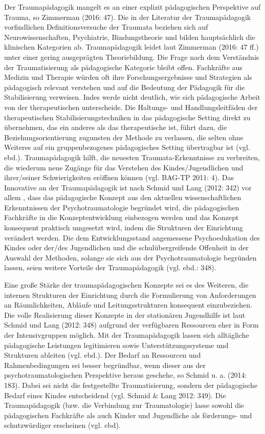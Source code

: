 Der Traumapädagogik mangelt es an einer explizit pädagogischen Perspektive auf Trauma, so Zimmerman (2016: 47). Die in der Literatur der Traumapädagogik vorfindlichen Definitionsversuche der Traumata beziehen sich auf Neurowissenschaften, Psychiatrie, Bindungstheorie und bilden hauptsächlich die klinischen Kategorien ab. Traumap{\"a}dagogik leidet laut Zimmerman (2016: 47 ff.) unter einer gering ausgeprägten Theoriebildung. Die Frage nach dem Verständnis der Traumatisierung als pädagogische Kategorie bleibt offen. Fachkräfte aus Medizin und Therapie würden oft ihre Forschungsergebnisse und Strategien als pädagogisch relevant verstehen und auf die Bedeutung der Pädagogik für die Stabilisierung verweisen. Indes werde nicht deutlich, wie sich pädagogische Arbeit von der therapeutischen unterscheide. Die Haltungs- und Handlungsleitfäden der therapeutischen Stabilisierungstechniken in das pädagogische Setting direkt zu übernehmen, das ein anderes als das therapeutische ist, führt dazu, die Beziehungsorientierung zugunsten der Methode zu verlassen, die selten ohne Weiteres auf ein gruppenbezogenes pädagogisches Setting übertragbar ist (vgl. ebd.). Traumapädagogik hilft, die neuesten Traumata-Erkenntnisse zu verbreiten, die wiederum neue Zugänge für das Verstehen des Kindes/Jugendlichen und ihrer/seiner Schwierigkeiten eröffnen können (vgl. BAG-TP 2011: 4).  
Das Innovative an der Traumap{\"a}dagogik ist nach Schmid und Lang (2012: 342) vor allem , dass das pädagogische Konzept aus den aktuellen wissenschaftlichen Erkenntnissen der Psychotraumatologie begründet wird, die pädagogischen Fachkräfte in die Konzeptentwicklung einbezogen werden und das Konzept konsequent praktisch umgesetzt wird, indem die Strukturen der Einrichtung verändert werden. Die dem Entwicklungsstand angemessene Psychoedukation des Kindes oder der/des Jugendlichen und die schulübergreifende Offenheit in der Auswahl der Methoden, solange sie sich aus der Psychotraumatologie begründen lassen, seien weitere Vorteile der Traumapädagogik (vgl. ebd.: 348).

Eine große Stärke der traumapädagogischen Konzepte sei es des Weiteren, die internen Strukturen der Einrichtung durch die Formulierung von Anforderungen an Räumlichkeiten, Abläufe und Leitungsstrukturen konsequent einzubeziehen. Die volle Realisierung dieser Konzepte in der stationären Jugendhilfe ist laut Schmid und Lang (2012: 348) aufgrund der verfügbaren Ressourcen eher in Form der Intensivgruppen möglich. Mit der Traumapädagogik lassen sich alltägliche pädagogische Leistungen legitimieren sowie Unterstützungssysteme und Strukturen ableiten (vgl. ebd.). Der Bedarf an Ressourcen und Rahmenbedingungen sei besser begründbar, wenn dieser aus der psychotraumatologischen Perspektive heraus geschehe, so Schmid u. a. (2014: 183). Dabei sei nicht die festgestellte Traumatisierung, sondern der p{\"a}dagogische Bedarf eines Kindes entscheidend (vgl. Schmid \& Lang 2012: 349). Die Traumapädagogik (bzw. die Verbindung zur Traumatologie) lasse sowohl die pädagogischen Fachkräfte als auch Kinder und Jugendliche als förderungs- und schutzwürdiger erscheinen (vgl. ebd).

